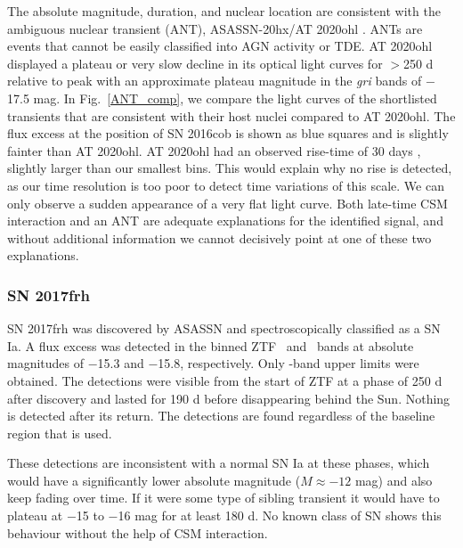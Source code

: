 \documentclass[a4paper,oneside,12pt, class=Latex/Classes/PhDthesisPSnPDF, crop=false]{standalone}
\begin{document}
The absolute magnitude, duration, and nuclear location are consistent with the ambiguous nuclear transient (ANT), ASASSN-20hx/AT 2020ohl \citep{Hinkle_Extreme_nuclear_transients/ANTs}. ANTs are events that cannot be easily classified into AGN activity or TDE. AT 2020ohl displayed a plateau or very slow decline in its optical light curves for $>$250 d relative to peak with an approximate plateau magnitude in the \textit{gri} bands of $-$17.5 mag. In Fig.~\ref{ANT_comp}, we compare the light curves of the shortlisted transients that are consistent with their host nuclei compared to AT 2020ohl. The  flux excess at the position of SN 2016cob is shown as blue squares and is slightly fainter than AT 2020ohl.  AT 2020ohl had an observed rise-time of 30 days \citep{Hinkle_Extreme_nuclear_transients/ANTs}, slightly larger than our smallest bins. This would explain why no rise is detected, as our time resolution is too poor to detect time variations of this scale. We can only observe a sudden appearance of a very flat light curve. Both late-time CSM interaction and an ANT are adequate explanations for the identified signal, and without additional information we cannot decisively point at one of these two explanations.


\subsubsection*{SN 2017frh}
SN 2017frh was discovered by ASASSN and spectroscopically classified as a SN Ia. A flux excess was detected in the binned ZTF \ztfg~and \ztfr~bands at absolute magnitudes of $-$15.3 and $-$15.8, respectively. Only \ztfi-band upper limits were obtained. The detections were visible from the start of ZTF at a phase of 250 d after discovery and lasted for 190 d before disappearing behind the Sun. Nothing is detected after its return. The detections are found regardless of the baseline region that is used.

These detections are inconsistent with a normal SN Ia at these phases, which would have a significantly lower absolute magnitude ($M\approx-12$ mag) and also keep fading over time. If it were some type of sibling transient it would have to plateau at $-$15 to $-$16 mag for at least 180 d. No known class of SN shows this behaviour without the help of CSM interaction.
\end{document}
